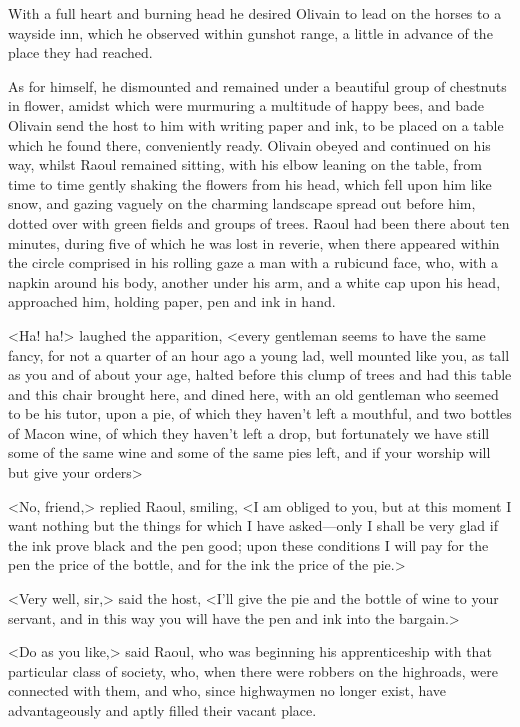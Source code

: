 With a full heart and burning head he desired Olivain to lead on the horses to a wayside inn, which he observed within gunshot range, a little in advance of the place they had reached.

As for himself, he dismounted and remained under a beautiful group of chestnuts in flower, amidst which were murmuring a multitude of happy bees, and bade Olivain send the host to him with writing paper and ink, to be placed on a table which he found there, conveniently ready. Olivain obeyed and continued on his way, whilst Raoul remained sitting, with his elbow leaning on the table, from time to time gently shaking the flowers from his head, which fell upon him like snow, and gazing vaguely on the charming landscape spread out before him, dotted over with green fields and groups of trees. Raoul had been there about ten minutes, during five of which he was lost in reverie, when there appeared within the circle comprised in his rolling gaze a man with a rubicund face, who, with a napkin around his body, another under his arm, and a white cap upon his head, approached him, holding paper, pen and ink in hand.

<Ha! ha!> laughed the apparition, <every gentleman seems to have the same fancy, for not a quarter of an hour ago a young lad, well mounted like you, as tall as you and of about your age, halted before this clump of trees and had this table and this chair brought here, and dined here, with an old gentleman who seemed to be his tutor, upon a pie, of which they haven't left a mouthful, and two bottles of Macon wine, of which they haven't left a drop, but fortunately we have still some of the same wine and some of the same pies left, and if your worship will but give your orders\longdash>

<No, friend,> replied Raoul, smiling, <I am obliged to you, but at this moment I want nothing but the things for which I have asked—only I shall be very glad if the ink prove black and the pen good; upon these conditions I will pay for the pen the price of the bottle, and for the ink the price of the pie.>

<Very well, sir,> said the host, <I'll give the pie and the bottle of wine to your servant, and in this way you will have the pen and ink into the bargain.>

<Do as you like,> said Raoul, who was beginning his apprenticeship with that particular class of society, who, when there were robbers on the highroads, were connected with them, and who, since highwaymen no longer exist, have advantageously and aptly filled their vacant place.

